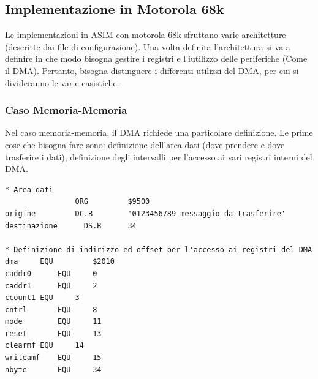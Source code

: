 \subsection{Implementazione in Motorola 68k}
Le implementazioni in ASIM con motorola 68k sfruttano varie architetture (descritte dai file di configurazione). Una volta definita l'architettura si va a definire in che modo bisogna gestire i registri e l'iutilizzo delle periferiche (Come il DMA). Pertanto, bisogna distinguere i differenti utilizzi del DMA, per cui si divideranno le varie casistiche.

\subsubsection{Caso Memoria-Memoria}
Nel caso memoria-memoria, il DMA richiede una particolare definizione. Le prime cose che bisogna fare sono: definizione dell'area dati (dove prendere e dove trasferire i dati); definizione degli intervalli per l'accesso ai vari registri interni del DMA.
\begin{lstlisting}
* Area dati
                ORG 		$9500
origine	        DC.B		'0123456789 messaggio da trasferire'
destinazione	  DS.B	    34

* Definizione di indirizzo ed offset per l'accesso ai registri del DMA
dma		EQU 		$2010
caddr0		EQU		0
caddr1		EQU		2
ccount1	EQU		3
cntrl		EQU		8
mode		EQU		11
reset		EQU		13
clearmf	EQU		14
writeamf	EQU		15
nbyte		EQU		34
\end{lstlisting}

